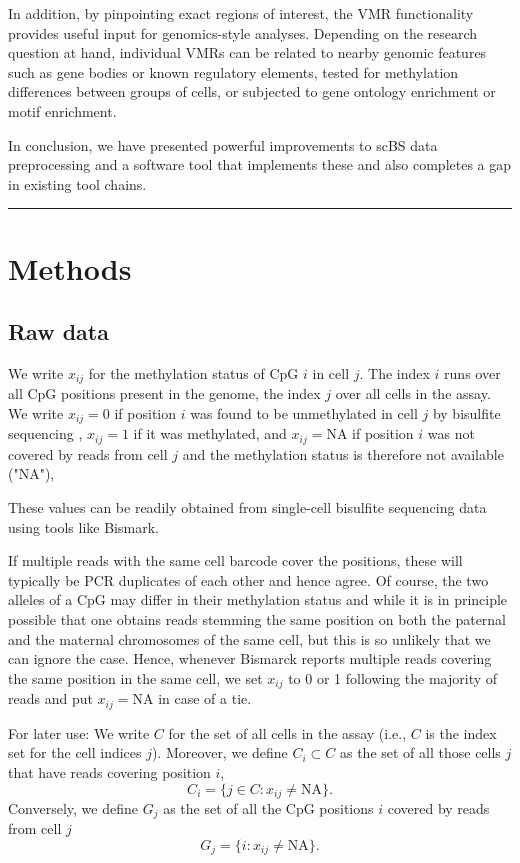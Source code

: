 \documentclass[twocolumn,10pt]{article}
\begin{document}
In addition, by pinpointing exact regions of interest, the VMR functionality provides useful input for genomics-style analyses.
Depending on the research question at hand, individual VMRs can be related to nearby genomic features such as gene bodies or known regulatory elements, tested for methylation differences between groups of cells, or subjected to gene ontology enrichment or motif enrichment.

In conclusion, we have presented powerful improvements to scBS data preprocessing and a software tool that implements these and also completes a gap in existing tool chains.

\vspace{1.4ex}
\noindent\hfil\rule{.6\columnwidth}{.2pt}\hfil

\section{Methods}

\subsection{Raw data}

We write $x_{ij}$ for the methylation status of CpG $i$ in cell $j$. The index $i$ runs over all CpG positions present in the genome, the index $j$ over all cells in the assay. We write $x_{ij}=0$ if position $i$ was found to be unmethylated in cell $j$ by bisulfite sequencing , $x_{ij}=1$ if it was methylated, and $x_{ij}=\text{NA}$ if position $i$ was not covered by reads from cell $j$ and the methylation status is therefore not available ("NA"),

These values can be readily obtained from single-cell bisulfite sequencing data using tools like Bismark.

If multiple reads with the same cell barcode cover the positions, these will typically be PCR duplicates of each other and hence agree. Of course, the two alleles of a CpG may differ in their methylation status and while it is in principle possible that one obtains reads stemming the same position on both the paternal and the maternal chromosomes of the same cell, but this is so unlikely that we can ignore the case. Hence, whenever Bismarck reports multiple reads covering the same position in the same cell, we set $x_{ij}$ to 0 or 1 following the majority of reads and put $x_{ij}=\text{NA}$ in case of a tie. 

For later use: We write $C$ for the set of all cells in the assay (i.e., $C$ is the index set for the cell indices $j$). Moreover,
we define $C_i\subset C$ as the set of all those cells $j$ that have reads covering position $i$,
$$ C_i=\{j\in C: x_{ij}\neq\text{NA}\}.$$
Conversely, we define $G_j$ as the set of all the CpG positions $i$ covered by reads from cell $j$ 
$$ G_j=\{i: x_{ij}\neq\text{NA}\}.$$
\end{document}
